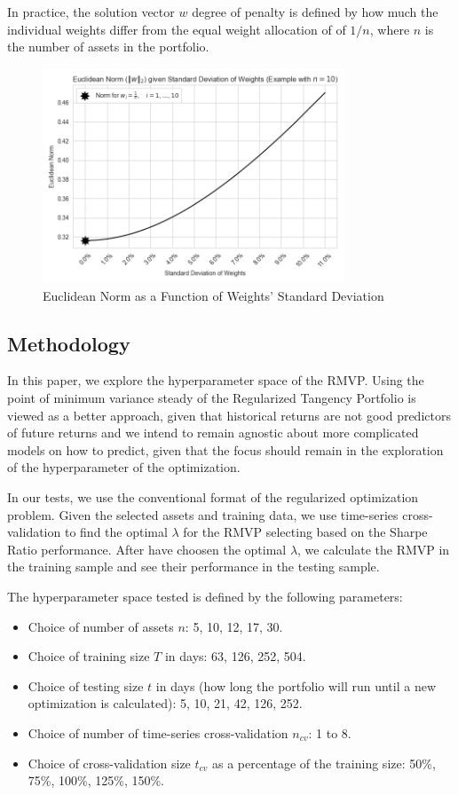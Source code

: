 \documentclass{article}
\begin{document}
In practice, the solution vector $w$ degree of penalty is defined by how much the individual weights differ from the equal weight allocation of of $1/n$, where $n$ is the number of assets in the portfolio.

\begin{figure}[h]
    \centering
    \includegraphics[width=0.8\textwidth]{graphics/report_euclidean_norm.png}
    \caption{Euclidean Norm as a Function of Weights' Standard Deviation}
    \label{fig:euclidean_norm}
\end{figure}

\subsection{Methodology}
In this paper, we explore the hyperparameter space of the RMVP. Using the point of minimum variance steady of the Regularized Tangency Portfolio is viewed as a better approach, given that historical returns are not good predictors of future returns and we intend to remain agnostic about more complicated models on how to predict, given that the focus should remain in the exploration of the hyperparameter of the optimization.

In our tests, we use the conventional format of the regularized optimization problem. Given the selected assets and training data, we use time-series cross-validation to find the optimal $\lambda$ for the RMVP selecting based on the Sharpe Ratio performance. After have choosen the optimal $\lambda$, we calculate the RMVP in the training sample and see their performance in the testing sample.

The hyperparameter space tested is defined by the following parameters:
\begin{itemize}
    \item Choice of number of assets $n$: 5, 10, 12, 17, 30.
    \item Choice of training size $T$ in days: 63, 126, 252, 504.
    \item Choice of testing size $t$ in days (how long the portfolio will run until a new optimization is calculated): 5, 10, 21, 42, 126, 252.
    \item Choice of number of time-series cross-validation $n_{cv}$: 1 to 8.
    \item Choice of cross-validation size $t_{cv}$ as a percentage of the training size: 50\%, 75\%, 100\%, 125\%, 150\%.
\end{itemize}
\end{document}
